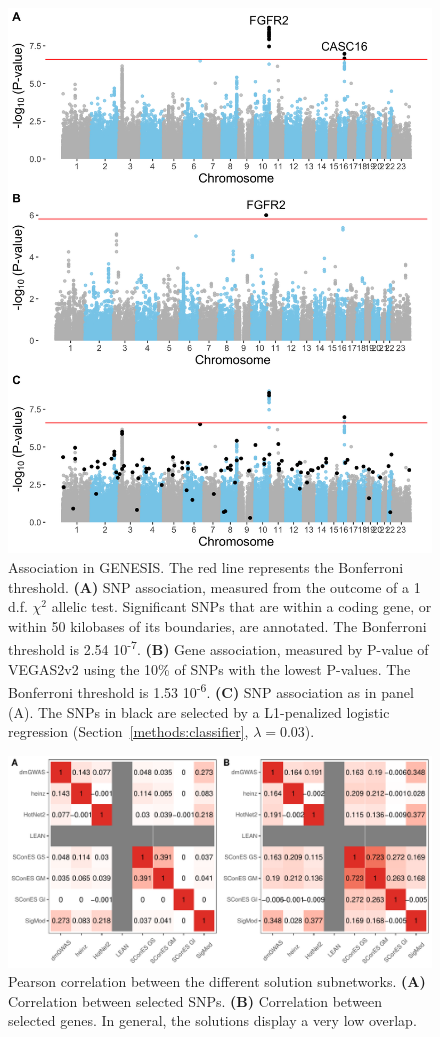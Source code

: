 \documentclass[twocolumn, 11pt]{article}
\begin{document}
\begin{figure}[htbp]
  \centering
  \includegraphics[width=.7\linewidth]{./figures/sfigure_2.png}
  \caption{\label{sfig:snp_gene_manhattan} Association in GENESIS. The red line represents the Bonferroni threshold. \textbf{(A)} SNP association, measured from the outcome of a 1 d.f. $\chi^2$ allelic test. Significant SNPs that are within a coding gene, or within 50 kilobases of its boundaries, are annotated. The Bonferroni threshold is 2.54 \texttimes{} 10\textsuperscript{-7}. \textbf{(B)} Gene association, measured by P-value of VEGAS2v2 \cite{mishra_vegas2:_2015} using the 10\% of SNPs with the lowest P-values. The Bonferroni threshold is 1.53 \texttimes{} 10\textsuperscript{-6}. \textbf{(C)} SNP association as in panel (A). The SNPs in black are selected by a L1-penalized logistic regression (Section~\ref{methods:classifier}, $\lambda = 0.03$).}
\end{figure}

\begin{figure}[htbp]
\centering
\includegraphics[width=.9\linewidth]{./figures/sfigure_3.pdf}
\caption{\label{sfig:pearson_methods}
Pearson correlation between the different solution subnetworks. \textbf{(A)} Correlation between selected SNPs. \textbf{(B)} Correlation between selected genes. In general, the solutions display a very low overlap.}
\end{figure}
\end{document}
